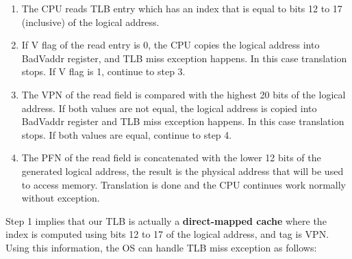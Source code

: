 \documentclass[]{scrartcl}
\begin{document}
\begin{enumerate}

\item The CPU reads TLB entry which has an index that is equal to
      bits 12 to 17 (inclusive) of the logical address.

\item If V flag of the read entry is 0, the CPU copies the logical
      address into BadVaddr register, and TLB miss exception happens.
      In this case translation stops. If V flag is 1, continue to
      step 3.

\item The VPN of the read field is compared with the highest 20
      bits of the logical address. If both values are not equal,
      the logical address is copied into BadVaddr register and
      TLB miss exception happens. In this case translation stops.
      If both values are equal, continue to step 4.

\item The PFN of the read field is concatenated with the lower
      12 bits of the generated logical address, the result is
      the physical address that will be used to access memory.
      Translation is done and the CPU continues work normally
      without exception.

\end{enumerate}

Step 1 implies that our TLB is actually a \textbf{direct-mapped cache}
where the index is computed using bits 12 to 17 of the logical address,
and tag is VPN. Using this information, the OS can handle TLB miss exception
as follows:
\end{document}

